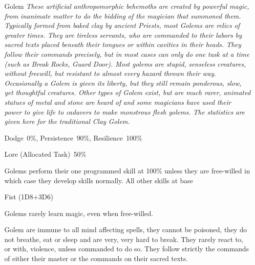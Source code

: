 \begin{monsterbox}{Golem}
	\textit{These artificial anthropomorphic behemoths are created by powerful magic, from inanimate matter to do the bidding of the magician that summoned them. Typically formed from baked clay by ancient Priests, most Golems are relics of greater times. They are tireless servants, who are commanded to their labors by sacred texts placed beneath their tongues or within cavities in their heads. They follow their commands precisely, but in most cases can only do one task at a time (such as Break Rocks, Guard Door). Most golems are stupid, senseless creatures, without freewill, but resistant to almost every hazard thrown their way. Occasionally a Golem is given its liberty, but they still remain ponderous, slow, yet thoughtful creatures. Other types of Golem exist, but are much rarer, animated statues of metal and stone are heard of and some magicians have used their power to give life to cadavers to make monstrous flesh golems. The statistics are given here for the traditional Clay Golem.}\\
	\rpghline
	\basics[%
        hitpoints  = 29,
	majorwound = 15,
	damagemodifier = +3D6,
	powerpoints = 4/11 (free willed),
	movementrate = 15m (cannot run),
	armor = Clay Body (8AP or 4AP against crushing weapons),
	plunderrating = 0
	]
	\rpghline%
	\stats[ %
		STR = 6D6+18 (39),
		CON = 3D6+18 (29),
		DEX = 2D6    (7),
		SIZ = 3D6+18 (29),
		INT = 1D6/2D6 (4/7),
		POW = 1D6/3D6 (4/11),
		CHA = 1D6/2D6 (4/7)
	]
	\rpghline%
	\begin{rpg-monsteraction}[Resistances]
		Dodge~0\%, Persistence~90\%, Resilience~100\%
	\end{rpg-monsteraction}
	\begin{rpg-monsteraction}[Knowledge]
		Lore (Allocated Task)~50\%
	\end{rpg-monsteraction}
	\begin{rpg-monsteraction}[Practical]
		Golems perform their one programmed skill at 100\% unless they are free-willed in which case they develop skills normally. All other skills at base %
	\end{rpg-monsteraction}
	\begin{rpg-monsteraction}
		Fist (1D8+3D6)
	\end{rpg-monsteraction}
	\begin{rpg-monsteraction}[Magic]
		Golems rarely learn magic, even when free-willed.
	\end{rpg-monsteraction}
	\begin{rpg-monsteraction}
		Golem are immune to all mind affecting spells, they cannot be poisoned, they do not breathe, eat or sleep and are very, very hard to break. They rarely react to, or with, violence, unless commanded to do so. They follow strictly the commands of either their master or the commands on their sacred texts.
	\end{rpg-monsteraction}

\end{monsterbox}

